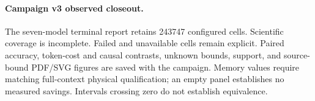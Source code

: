 \paragraph{Campaign v3 observed closeout.} The seven-model terminal report retains 243747 configured cells. Scientific coverage is incomplete. Failed and unavailable cells remain explicit. Paired accuracy, token-cost and causal contrasts, unknown bounds, support, and source-bound PDF/SVG figures are saved with the campaign. Memory values require matching full-context physical qualification; an empty panel establishes no measured savings. Intervals crossing zero do not establish equivalence.\par
